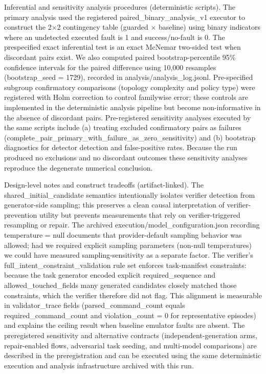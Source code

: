 \documentclass[conference]{IEEEtran}
\begin{document}
Inferential and sensitivity analysis procedures (deterministic scripts). The primary analysis used the registered paired\_binary\_analysis\_v1 executor to construct the 2\ensuremath{\times}2 contingency table (guarded \ensuremath{\times} baseline) using binary indicators where an undetected executed fault is 1 and success/no-fault is 0. The prespecified exact inferential test is an exact McNemar two-sided test when discordant pairs exist. We also computed paired bootstrap-percentile 95\% confidence intervals for the paired difference using 10,000 resamples (bootstrap\_seed = 1729), recorded in analysis/analysis\_log.jsonl. Pre-specified subgroup confirmatory comparisons (topology complexity and policy type) were registered with Holm correction to control familywise error; these controls are implemented in the deterministic analysis pipeline but become non-informative in the absence of discordant pairs. Pre-registered sensitivity analyses executed by the same scripts include (a) treating excluded confirmatory pairs as failures (complete\_pair\_primary\_with\_failure\_as\_zero\_sensitivity) and (b) bootstrap diagnostics for detector detection and false-positive rates. Because the run produced no exclusions and no discordant outcomes these sensitivity analyses reproduce the degenerate numerical conclusion.

Design-level notes and construct tradeoffs (artifact-linked). The shared\_initial\_candidate semantics intentionally isolates verifier detection from generator-side sampling; this preserves a clean causal interpretation of verifier-prevention utility but prevents measurements that rely on verifier-triggered resampling or repair. The archived execution/model\_configuration.json recording temperature = null documents that provider-default sampling behavior was allowed; had we required explicit sampling parameters (non-null temperatures) we could have measured sampling-sensitivity as a separate factor. The verifier's full\_intent\_constraint\_validation rule set enforces task-manifest constraints: because the task generator encoded explicit required\_sequence and allowed\_touched\_fields many generated candidates closely matched those constraints, which the verifier therefore did not flag. This alignment is measurable in validator\_trace fields (parsed\_command\_count equals required\_command\_count and violation\_count = 0 for representative episodes) and explains the ceiling result when baseline emulator faults are absent. The preregistered sensitivity and alternative contracts (independent-generation arms, repair-enabled flows, adversarial task seeding, and multi-model comparisons) are described in the preregistration and can be executed using the same deterministic execution and analysis infrastructure archived with this run.
\end{document}
